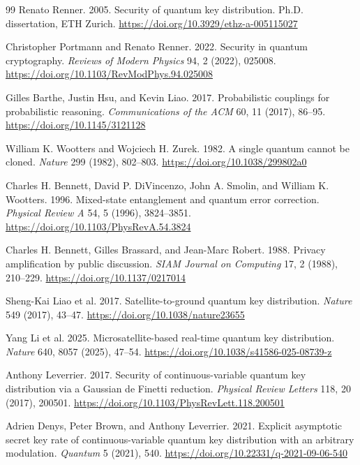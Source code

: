 \documentclass[conference,compsoc]{IEEEtran}
\begin{document}
\begin{thebibliography}{99}
Renato Renner.
2005.
Security of quantum key distribution.
Ph.D. dissertation, ETH Zurich.
\url{https://doi.org/10.3929/ethz-a-005115027}

Christopher Portmann and Renato Renner.
2022.
Security in quantum cryptography.
\emph{Reviews of Modern Physics} 94, 2 (2022), 025008.
\url{https://doi.org/10.1103/RevModPhys.94.025008}

Gilles Barthe, Justin Hsu, and Kevin Liao.
2017.
Probabilistic couplings for probabilistic reasoning.
\emph{Communications of the ACM} 60, 11 (2017), 86--95.
\url{https://doi.org/10.1145/3121128}

William K. Wootters and Wojciech H. Zurek.
1982.
A single quantum cannot be cloned.
\emph{Nature} 299 (1982), 802--803.
\url{https://doi.org/10.1038/299802a0}

Charles H. Bennett, David P. DiVincenzo, John A. Smolin, and William K. Wootters.
1996.
Mixed-state entanglement and quantum error correction.
\emph{Physical Review A} 54, 5 (1996), 3824--3851.
\url{https://doi.org/10.1103/PhysRevA.54.3824}

Charles H. Bennett, Gilles Brassard, and Jean-Marc Robert.
1988.
Privacy amplification by public discussion.
\emph{SIAM Journal on Computing} 17, 2 (1988), 210--229.
\url{https://doi.org/10.1137/0217014}

Sheng-Kai Liao et al.
2017.
Satellite-to-ground quantum key distribution.
\emph{Nature} 549 (2017), 43--47.
\url{https://doi.org/10.1038/nature23655}

Yang Li et al.
2025.
Microsatellite-based real-time quantum key distribution.
\emph{Nature} 640, 8057 (2025), 47--54.
\url{https://doi.org/10.1038/s41586-025-08739-z}

Anthony Leverrier.
2017.
Security of continuous-variable quantum key distribution via a Gaussian de Finetti reduction.
\emph{Physical Review Letters} 118, 20 (2017), 200501.
\url{https://doi.org/10.1103/PhysRevLett.118.200501}

Adrien Denys, Peter Brown, and Anthony Leverrier.
2021.
Explicit asymptotic secret key rate of continuous-variable quantum key distribution with an arbitrary modulation.
\emph{Quantum} 5 (2021), 540.
\url{https://doi.org/10.22331/q-2021-09-06-540}


\end{thebibliography}
\end{document}

